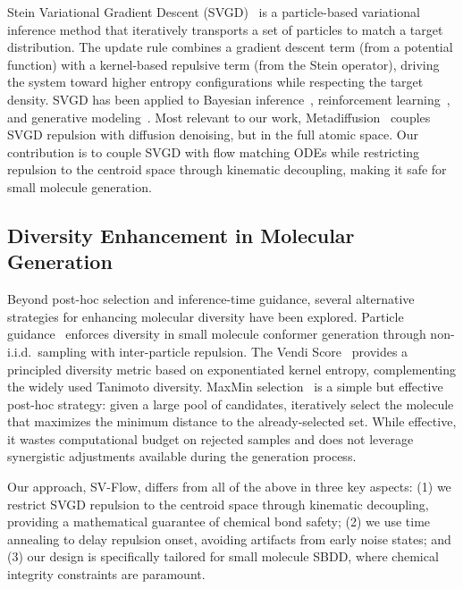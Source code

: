 \documentclass[a4paper,11pt]{article}
\begin{document}
Stein Variational Gradient Descent (SVGD)~\cite{liu2016svgd} is a particle-based
variational inference method that iteratively transports a set of particles to
match a target distribution.  The update rule combines a gradient descent term
(from a potential function) with a kernel-based repulsive term (from the Stein
operator), driving the system toward higher entropy configurations while
respecting the target density.  SVGD has been applied to Bayesian
inference~\cite{liu2017svgd}, reinforcement learning~\cite{liu2017svgd}, and
generative modeling~\cite{wang2019svgd}.  Most relevant to our work,
Metadiffusion~\cite{lam2026metadiffusion} couples SVGD repulsion with diffusion
denoising, but in the full atomic space.  Our contribution is to couple SVGD
with flow matching ODEs while restricting repulsion to the centroid space through
kinematic decoupling, making it safe for small molecule generation.

\subsection{Diversity Enhancement in Molecular Generation}

Beyond post-hoc selection and inference-time guidance, several alternative
strategies for enhancing molecular diversity have been explored.  Particle
guidance~\cite{corso2023particle} enforces diversity in small molecule conformer
generation through non-i.i.d.\ sampling with inter-particle repulsion.  The Vendi
Score~\cite{friedman2023vendi} provides a principled diversity metric based on
exponentiated kernel entropy, complementing the widely used Tanimoto diversity.
MaxMin selection~\cite{maxmin} is a simple but effective post-hoc strategy: given
a large pool of candidates, iteratively select the molecule that maximizes the
minimum distance to the already-selected set.  While effective, it wastes
computational budget on rejected samples and does not leverage synergistic
adjustments available during the generation process.

Our approach, SV-Flow, differs from all of the above in three key aspects:
(1) we restrict SVGD repulsion to the centroid space through kinematic
decoupling, providing a mathematical guarantee of chemical bond safety;
(2) we use time annealing to delay repulsion onset, avoiding artifacts from early
noise states; and (3) our design is specifically tailored for small molecule
SBDD, where chemical integrity constraints are paramount.

\end{document}
